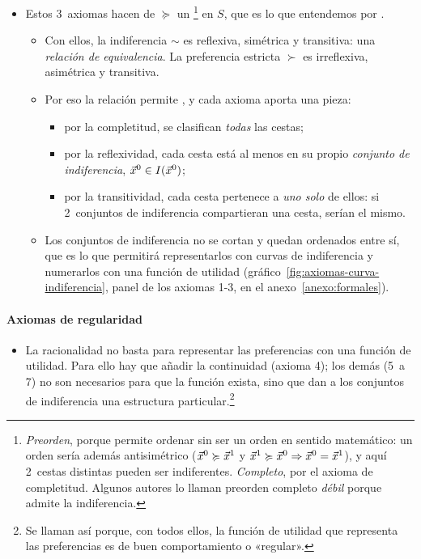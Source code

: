 \documentclass[11pt]{article}
\begin{document}
\begin{itemize}
\item Estos 3~axiomas hacen de $\succcurlyeq$ un \footnote{\emph{Preorden}, porque permite ordenar sin ser un orden en sentido matemático: un orden sería además antisimétrico ($\vec{x}^0\succcurlyeq \vec{x}^1$ y $\vec{x}^1\succcurlyeq \vec{x}^0 \Rightarrow \vec{x}^0=\vec{x}^1$), y aquí 2~cestas distintas pueden ser indiferentes. \emph{Completo}, por el axioma de completitud. Algunos autores lo llaman preorden completo \emph{débil} porque admite la indiferencia.} en $S$, que es lo que entendemos por .
  \begin{itemize}
  \item Con ellos, la indiferencia $\sim$ es reflexiva, simétrica y transitiva: una \emph{relación de equivalencia}. La preferencia estricta $\succ$ es irreflexiva, asimétrica y transitiva.
  \item Por eso la relación permite , y cada axioma aporta una pieza:
    \begin{itemize}
    \item por la completitud, se clasifican \emph{todas} las cestas;
    \item por la reflexividad, cada cesta está al menos en su propio \emph{conjunto de indiferencia}, $\vec{x}^0\in I(\vec{x}^0)$;
    \item por la transitividad, cada cesta pertenece a \emph{uno solo} de ellos: si 2~conjuntos de indiferencia compartieran una cesta, serían el mismo.
    \end{itemize}
  \item Los conjuntos de indiferencia no se cortan y quedan ordenados entre sí, que es lo que permitirá representarlos con curvas de indiferencia y numerarlos con una función de utilidad (gráfico~\ref{fig:axiomas-curva-indiferencia}, panel de los axiomas 1-3, en el anexo~\ref{anexo:formales}).
  \end{itemize}
\end{itemize}

\paragraph{Axiomas de regularidad}

\begin{itemize}
\item La racionalidad no basta para representar las preferencias con una función de utilidad. Para ello hay que añadir la continuidad (axioma 4); los demás  (5~a 7) no son necesarios para que la función exista, sino que dan a los conjuntos de indiferencia una estructura particular.\footnote{Se llaman así porque, con todos ellos, la función de utilidad que representa las preferencias es de buen comportamiento o «regular».}
\end{itemize}
\end{document}
